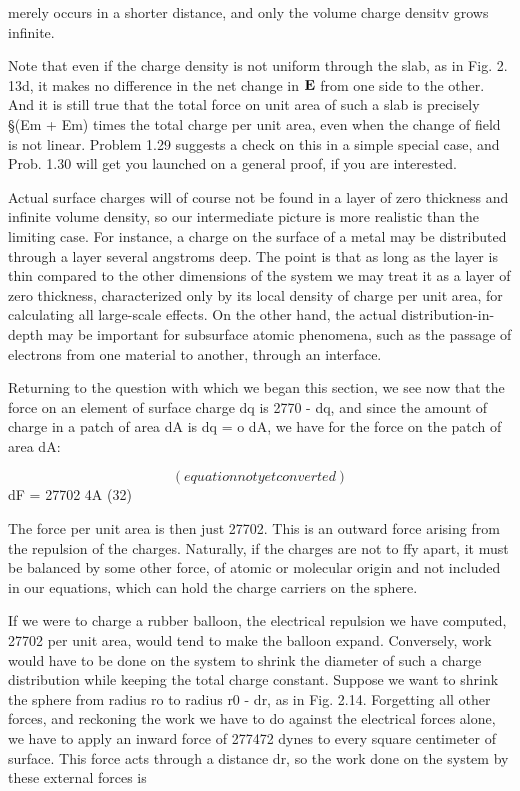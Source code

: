merely occurs in a shorter distance, and only the volume charge
densitv grows infinite.

 

Note that even if the charge density is not uniform through the slab,
as in Fig. 2. 13d, it makes no difference in the net change in $\mathbf{E}$ from one
side to the other. And it is still true that the total force on unit area
of such a slab is precisely §(Em + Em) times the total charge per unit
area, even when the change of field is not linear. Problem 1.29 suggests
a check on this in a simple special case, and Prob. 1.30 will get
you launched on a general proof, if you are interested.

Actual surface charges will of course not be found in a layer of zero
thickness and infinite volume density, so our intermediate picture is
more realistic than the limiting case. For instance, a charge on the
surface of a metal may be distributed through a layer several
angstroms deep. The point is that as long as the layer is thin compared
to the other dimensions of the system we may treat it as a layer
of zero thickness, characterized only by its local density of charge
per unit area, for calculating all large-scale effects. On the other
hand, the actual distribution-in-depth may be important for subsurface
atomic phenomena, such as the passage of electrons from one
material to another, through an interface.

Returning to the question with which we began this section, we see
now that the force on an element of surface charge dq is 2770 - dq, and
since the amount of charge in a patch of area dA is dq = o dA, we
have for the force on the patch of area dA:

\begin{equation}
(equation not yet converted)
\end{equation}
dF = 27702 4A (32)

The force per unit area is then just 27702. This is an outward force
arising from the repulsion of the charges. Naturally, if the charges
are not to ffy apart, it must be balanced by some other force, of atomic
or molecular origin and not included in our equations, which can hold
the charge carriers on the sphere.

If we were to charge a rubber balloon, the electrical repulsion we
have computed, 27702 per unit area, would tend to make the balloon
expand. Conversely, work would have to be done on the system to
shrink the diameter of such a charge distribution while keeping the
total charge constant. Suppose we want to shrink the sphere from
radius ro to radius r0 - dr, as in Fig. 2.14. Forgetting all other
forces, and reckoning the work we have to do against the electrical
forces alone, we have to apply an inward force of 277472 dynes to every
square centimeter of surface. This force acts through a distance dr,
so the work done on the system by these external forces is

